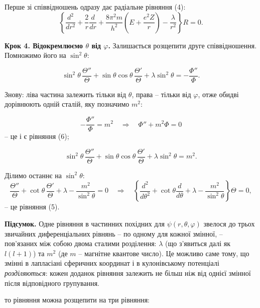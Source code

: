 \documentclass{article}
\begin{document}
\begin{tcolorbox}[vintagebox, title={\upshape\rule{4mm}{0.3pt}~~Детально: як саме відбувається розщеплення~~\rule{4mm}{0.3pt}}]
Перше зі співвідношень одразу дає радіальне рівняння (4):
\begin{equation*}
\left\{ \frac{d^2}{dr^2} + \frac{2}{r} \frac{d}{dr} + \frac{8\pi^2 m}{h^2} \left( E + \frac{e^2Z}{r} \right) - \frac{\lambda}{r^2} \right\} R = 0.
\end{equation*}

\textbf{Крок 4. Відокремлюємо $\theta$ від $\varphi$.}
Залишається розщепити друге співвідношення. Помножимо його на $\sin^2\theta$:

\begin{equation*}
\sin^2\theta\,\frac{\Theta''}{\Theta} + \sin\theta\cos\theta\,\frac{\Theta'}{\Theta} + \lambda\sin^2\theta = -\frac{\Phi''}{\Phi}.
\end{equation*}

Знову: ліва частина залежить тільки від $\theta$, права -- тільки від $\varphi$, отже обидві дорівнюють одній сталій, яку позначимо $m^2$:

\begin{equation*}
-\frac{\Phi''}{\Phi} = m^2
\quad\Longrightarrow\quad
\Phi'' + m^2 \Phi = 0
\end{equation*}
-- це і є рівняння (6);

\begin{equation*}
\sin^2\theta\,\frac{\Theta''}{\Theta} + \sin\theta\cos\theta\,\frac{\Theta'}{\Theta} + \lambda\sin^2\theta = m^2.
\end{equation*}

Ділимо останнє на $\sin^2\theta$:
\begin{equation*}
\frac{\Theta''}{\Theta} + \cot\theta\,\frac{\Theta'}{\Theta} + \lambda - \frac{m^2}{\sin^2\theta} = 0
\quad\Longrightarrow\quad
\left\{ \frac{d^2}{d\theta^2} + \cot \theta \frac{d}{d\theta} + \lambda - \frac{m^2}{\sin^2 \theta} \right\} \Theta = 0,
\end{equation*}
-- це рівняння (5).

\textbf{Підсумок.} Одне рівняння в частинних похідних для $\psi(r,\theta,\varphi)$ звелося до трьох звичайних диференціальних рівнянь -- по одному для кожної змінної, -- пов'язаних між собою двома сталими розділення: $\lambda$ (що з'явиться далі як $l(l+1)$) та $m^2$ (де $m$ -- магнітне квантове число). Це можливо саме тому, що змінні в лапласіані сферичних координат і в кулонівському потенціалі \emph{розділяються}: кожен доданок рівняння залежить не більш ніж від однієї змінної після відповідного групування.
\end{tcolorbox}

то рівняння можна розщепити на три рівняння:
\end{document}

